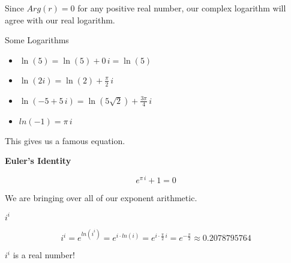 \documentclass{ximera}
\begin{document}
Since $Arg(r) = 0$ for any positive real number, our complex logarithm will agree with our real logarithm.








\begin{example} Some Logarithms


\begin{itemize}
\item $\ln(5) = \ln(5) + 0 \, i = \ln(5)$

\item $\ln(2i) = \ln(2) + \frac{\pi}{2} \, i$

\item $\ln(-5 + 5 \, i) = \ln(5 \sqrt{2}) + \frac{3\pi}{4}\, i$

\item $ln(-1) = \pi \, i$



\end{itemize}




\end{example}




This gives us a famous equation.



\begin{theorem} \textbf{\textcolor{blue!55!black}{Euler's Identity}} 

\[  e^{\pi \, i} + 1 = 0       \]

\end{theorem}





We are bringing over all of our exponent arithmetic.



\begin{example}  $i^i$


\[    i^i =  e^{ln(i^i)} = e^{i \cdot ln(i)} = e^{ i \cdot \tfrac{\pi}{2} \, i}   = e^{-\tfrac{\pi}{2}} \approx  0.2078795764\]



\begin{center}

$i^i$ is a real number!
\end{center}


\end{example}
\end{document}
